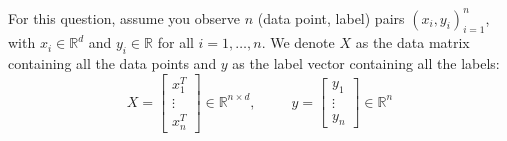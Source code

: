 \documentclass{article}
\begin{document}
For this question, assume you observe $n$ (data point, label) pairs $(x_{i}, y_{i})^{n}_{i = 1}$, with $x_{i} \in \mathbb{R}^{d}$ and $y_{i} \in \mathbb{R}$ for all $i = 1, \ldots, n$. We denote $X$ as the data matrix containing all the data points and $y$ as the label vector containing all the labels:
    \begin{equation*}
        X = \begin{bmatrix}
            x_{1}^{T} \\
            \vdots    \\
            x_{n}^{T}   
        \end{bmatrix} \in \mathbb{R}^{ n \times d}, \hspace{30pt}  y = \begin{bmatrix}
            y_{1}  \\
            \vdots \\
            y_{n}    
        \end{bmatrix} \in \mathbb{R}^{n}
    \end{equation*}
\end{document}
